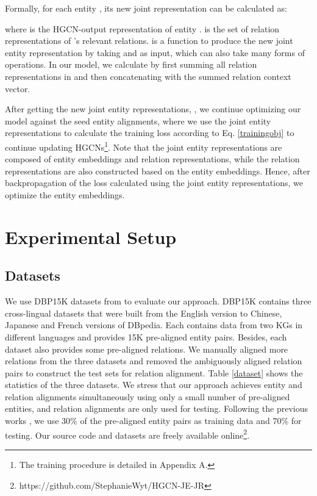 \documentclass[11pt,a4paper]{article}
\begin{document}
Formally, for each entity , its new joint representation   can be calculated as:

where  is the HGCN-output representation of entity .
 is the set of relation representations of 's relevant relations.  is a function to produce the new joint entity representation by taking  and  as input, which can also take many forms of operations. In our model, we calculate
 by first summing all relation representations in  and then concatenating  with the summed relation context vector.


After getting the new joint entity representations, , we continue optimizing our model against the seed entity alignments, where we use the joint entity representations to calculate the training loss according to Eq. \ref{trainingobj} to continue updating HGCNs\footnote{The training procedure is detailed in Appendix A.}. Note that the joint entity representations are composed of entity embeddings and relation representations, while the relation representations are also constructed based on the entity embeddings. Hence, after backpropagation of the loss calculated using the joint entity representations, we optimize the entity embeddings.


\section{Experimental Setup}
\subsection{Datasets}
\label{subsection:datasets}
We use DBP15K datasets from \cite{sun2017cross} to evaluate our approach. DBP15K contains three cross-lingual datasets that were built from the English version to Chinese, Japanese and French versions of DBpedia. Each contains data from two KGs in different languages and provides 15K pre-aligned entity pairs. Besides, each dataset also provides some pre-aligned relations. We manually aligned more relations from the three datasets and removed the ambiguously aligned relation pairs to construct the test sets for relation alignment. Table \ref{dataset} shows the statistics of the three datasets. We stress that our approach achieves entity and relation alignments simultaneously using only a small number of pre-aligned entities, and relation alignments are only used for testing. Following the previous works \cite{sun2017cross,D18-1032,ijcai2018-611}, we use 30\% of the pre-aligned entity pairs as training data and 70\% for testing. Our source code and datasets are freely available online\footnote{https://github.com/StephanieWyt/HGCN-JE-JR}.
\end{document}
